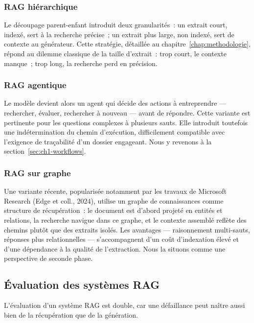 \subsubsection{RAG hiérarchique}

Le découpage parent-enfant introduit deux granularités~: un extrait court,
indexé, sert à la recherche précise~; un extrait plus large, non indexé,
sert de contexte au générateur. Cette stratégie, détaillée au
chapitre~\ref{chap:methodologie}, répond au dilemme classique de la taille
d'extrait~: trop court, le contexte manque~; trop long, la recherche perd
en précision.

\subsubsection{RAG agentique}

Le modèle devient alors un agent qui décide des actions à entreprendre ---
rechercher, évaluer, rechercher à nouveau --- avant de répondre. Cette
variante est pertinente pour les questions complexes à plusieurs sauts. Elle
introduit toutefois une indétermination du chemin d'exécution, difficilement
compatible avec l'exigence de traçabilité d'un dossier engageant. Nous y
revenons à la section~\ref{sec:ch1-workflows}.

\subsubsection{RAG sur graphe}

Une variante récente, popularisée notamment par les travaux de Microsoft
Research (Edge et coll., 2024), utilise un graphe de connaissances comme
structure de récupération~: le document est d'abord projeté en entités et
relations, la recherche navigue dans ce graphe, et le contexte assemblé
reflète des chemins plutôt que des extraits isolés. Les avantages ---
raisonnement multi-sauts, réponses plus relationnelles --- s'accompagnent
d'un coût d'indexation élevé et d'une dépendance à la qualité de
l'extraction. Nous la situons comme une perspective de seconde phase.

\subsection{Évaluation des systèmes RAG}

L'évaluation d'un système RAG est double, car une défaillance peut naître
aussi bien de la récupération que de la génération.

